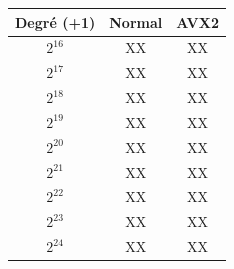 \documentclass[12pt, a4paper]{article}
\begin{document}
\begin{center}
\begin{tabular}{||c c c||}
\hline
Degré (+1) & Normal & AVX2 \\
\hline\hline
$2^{16}$ & XX & XX \\
\hline
$2^{17}$ & XX & XX \\
\hline
$2^{18}$ & XX & XX \\
\hline
$2^{19}$ & XX & XX \\
\hline
$2^{20}$ & XX & XX \\
\hline
$2^{21}$ & XX & XX \\
\hline
$2^{22}$ & XX & XX \\
\hline
$2^{23}$ & XX & XX \\
\hline
$2^{24}$ & XX & XX \\
\hline
\end{tabular}
\end{center}



\end{document}
